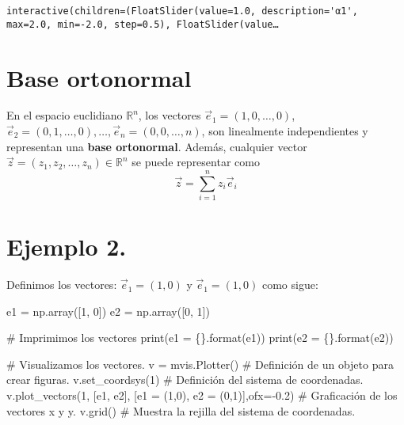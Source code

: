 \documentclass[
  letterpaper,
  DIV=11,
  numbers=noendperiod]{scrreprt}
\newenvironment{Shaded}{\begin{snugshade}}{\end{snugshade}}
\newcommand{\BuiltInTok}[1]{\textcolor[rgb]{0.00,0.23,0.31}{#1}}
\newcommand{\CommentTok}[1]{\textcolor[rgb]{0.37,0.37,0.37}{#1}}
\newcommand{\DecValTok}[1]{\textcolor[rgb]{0.68,0.00,0.00}{#1}}
\newcommand{\FloatTok}[1]{\textcolor[rgb]{0.68,0.00,0.00}{#1}}
\newcommand{\NormalTok}[1]{\textcolor[rgb]{0.00,0.23,0.31}{#1}}
\newcommand{\OperatorTok}[1]{\textcolor[rgb]{0.37,0.37,0.37}{#1}}
\newcommand{\SpecialCharTok}[1]{\textcolor[rgb]{0.37,0.37,0.37}{#1}}
\newcommand{\StringTok}[1]{\textcolor[rgb]{0.13,0.47,0.30}{#1}}
\begin{document}
\begin{verbatim}
interactive(children=(FloatSlider(value=1.0, description='α1', max=2.0, min=-2.0, step=0.5), FloatSlider(value…
\end{verbatim}

\section{Base ortonormal}\label{base-ortonormal}

En el espacio euclidiano \(\mathbb{R}^n\), los vectores
\(\vec{e}_1 = (1,0,\dots,0)\),
\(\vec{e}_2 = (0,1,\dots,0), \dots, \vec{e}_n = (0,0,\dots,n)\), son
linealmente independientes y representan una \textbf{base ortonormal}.
Además, cualquier vector
\(\vec{z} = (z_1, z_2, \dots, z_n) \in \mathbb{R}^n\) se puede
representar como \[
\vec{z} = \sum_{i=1}^n z_i \vec{e}_i
\]

\section{\texorpdfstring{\textbf{Ejemplo
2.}}{Ejemplo 2.}}\label{ejemplo-2.}

Definimos los vectores: \(\vec{e}_1 = (1,0)\) y \(\vec{e}_1 = (1,0)\)
como sigue:

\begin{Shaded}
\begin{Highlighting}[]
\NormalTok{e1 }\OperatorTok{=}\NormalTok{ np.array([}\DecValTok{1}\NormalTok{, }\DecValTok{0}\NormalTok{])}
\NormalTok{e2 }\OperatorTok{=}\NormalTok{ np.array([}\DecValTok{0}\NormalTok{, }\DecValTok{1}\NormalTok{])}

\CommentTok{\# Imprimimos los vectores}
\BuiltInTok{print}\NormalTok{(}\StringTok{\textquotesingle{}e1 = }\SpecialCharTok{\{\}}\StringTok{\textquotesingle{}}\NormalTok{.}\BuiltInTok{format}\NormalTok{(e1))}
\BuiltInTok{print}\NormalTok{(}\StringTok{\textquotesingle{}e2 = }\SpecialCharTok{\{\}}\StringTok{\textquotesingle{}}\NormalTok{.}\BuiltInTok{format}\NormalTok{(e2))}

\CommentTok{\# Visualizamos los vectores.}
\NormalTok{v }\OperatorTok{=}\NormalTok{ mvis.Plotter()  }\CommentTok{\# Definición de un objeto para crear figuras.}
\NormalTok{v.set\_coordsys(}\DecValTok{1}\NormalTok{)   }\CommentTok{\# Definición del sistema de coordenadas.}
\NormalTok{v.plot\_vectors(}\DecValTok{1}\NormalTok{, [e1, e2], [}\StringTok{\textquotesingle{}e1 = (1,0)\textquotesingle{}}\NormalTok{, }\StringTok{\textquotesingle{}e2 = (0,1)\textquotesingle{}}\NormalTok{],ofx}\OperatorTok{={-}}\FloatTok{0.2}\NormalTok{) }\CommentTok{\# Graficación de los vectores \textquotesingle{}x\textquotesingle{} y \textquotesingle{}y\textquotesingle{}.}
\NormalTok{v.grid()  }\CommentTok{\# Muestra la rejilla del sistema de coordenadas.}
\end{Highlighting}
\end{Shaded}
\end{document}
